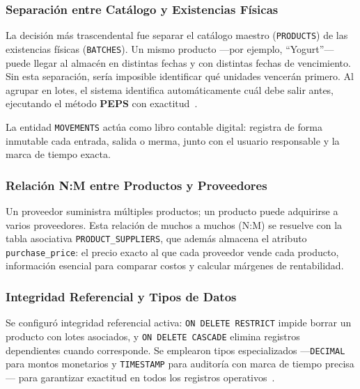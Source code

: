 \documentclass[journal]{IEEEtran}
\newcommand{\peps}{\textbf{PEPS}}
\begin{document}
	\subsubsection{Separaci\'{o}n entre Cat\'{a}logo y Existencias F\'{i}sicas}
	
	La decisi\'{o}n m\'{a}s trascendental fue separar el cat\'{a}logo maestro
	(\texttt{PRODUCTS}) de las existencias f\'{i}sicas (\texttt{BATCHES}).
	Un mismo producto ---por ejemplo, ``Yogurt''--- puede llegar al
	almac\'{e}n en distintas fechas y con distintas fechas de vencimiento.
	Sin esta separaci\'{o}n, ser\'{i}a imposible identificar qu\'{e} unidades
	vencer\'{a}n primero. Al agrupar en lotes, el sistema identifica
	autom\'{a}ticamente cu\'{a}l debe salir antes, ejecutando el m\'{e}todo
	\peps{} con exactitud~\cite{Silver:2016}.
	
	La entidad \texttt{MOVEMENTS} act\'{u}a como libro contable digital:
	registra de forma inmutable cada entrada, salida o merma, junto
	con el usuario responsable y la marca de tiempo exacta.
	
	\subsubsection{Relaci\'{o}n N:M entre Productos y Proveedores}
	
	Un proveedor suministra m\'{u}ltiples productos; un producto puede
	adquirirse a varios proveedores. Esta relaci\'{o}n de muchos a muchos
	(N:M) se resuelve con la tabla asociativa
	\texttt{PRODUCT\_SUPPLIERS}, que adem\'{a}s almacena el atributo
	\texttt{purchase\_price}: el precio exacto al que cada proveedor
	vende cada producto, informaci\'{o}n esencial para comparar costos
	y calcular m\'{a}rgenes de rentabilidad.
	
	\subsubsection{Integridad Referencial y Tipos de Datos}
	
	Se configur\'{o} integridad referencial activa: \texttt{ON DELETE
		RESTRICT} impide borrar un producto con lotes asociados, y
	\texttt{ON DELETE CASCADE} elimina registros dependientes cuando
	corresponde. Se emplearon tipos especializados ---\texttt{DECIMAL}
	para montos monetarios y \texttt{TIMESTAMP} para auditor\'{i}a
	con marca de tiempo precisa--- para garantizar exactitud
	en todos los registros operativos~\cite{Elmasri:2016}.
	
\end{document}
